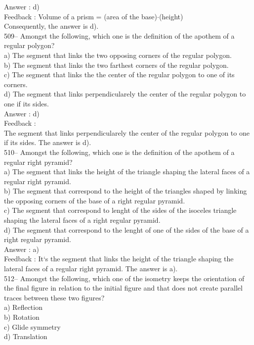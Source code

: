 ﻿\documentclass[letterpaper, 12pt]{article}
\begin{document}
Answer : d)\\

Feedback :
Volume of a prism = (area of the base)$\cdot$(height)\\
Consequently, the answer is d).\\

509-- Amongst the following, which one is the definition of the apothem of a regular polygon?\\
a) The segment that links the two opposing corners of the regular polygon.\\
b) The segment that links the two farthest corners of the regular polygon.\\
c) The segment that links the the center of the regular polygon to one of its corners.\\
d) The segment that links perpendicularely the center of the regular polygon to one if its sides.\\

Answer : d)\\

Feedback :  \\
The segment that links perpendicularely the center of the regular polygon to one if its sides.  The answer is d).\\

510-- Amongst the following, which one is the definition of the apothem of a regular right pyramid?\\
a) The segment that links the height of the triangle shaping the lateral faces of a regular right pyramid. \\
b) The segment that correspond to the height of the triangles shaped by linking the opposing corners of the base of a right regular pyramid.\\
c) The segment that correspond to lenght of the sides of the isoceles triangle shaping the lateral faces of a right regular pyramid.\\
d) The segment that correspond to the lenght of one of the sides of the base of a right regular pyramid.\\

Answer : a)\\

Feedback :
It`s the segment that links the height of the triangle shaping the lateral faces of a regular right pyramid.  The answer is a).\\


512--  Amongst the following, which one of the isometry keeps the orientation of the final figure in relation to the initial figure and that does not create parallel traces between these two figures?\\
a) Reflection\\
b) Rotation\\
c) Glide symmetry\\
d) Translation\\
\end{document}
